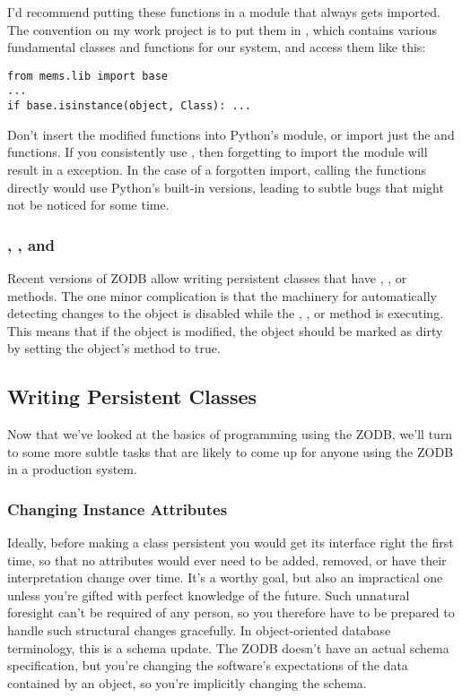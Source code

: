 I'd recommend putting these functions in a module that always gets
imported.  The convention on my work project is to put them in
, which contains various fundamental classes
and functions for our system, and access them like this:

\begin{verbatim}
from mems.lib import base
...
if base.isinstance(object, Class): ...
\end{verbatim}

Don't insert the modified functions into Python's
 module, or import just the
 and  functions.  
If you consistently use , then forgetting
to import the  module will result in a
 exception.  In the
case of a forgotten import, calling the functions directly would use
Python's built-in versions, leading to subtle bugs that might not be
noticed for some time.

\subsubsection{, , and }

Recent versions of ZODB allow writing persistent classes that have
, , or 
methods.  The one minor complication is that the machinery for
automatically detecting changes to the object is disabled while the
, , or 
method is executing.  This means that if the object is modified, the
object should be marked as dirty by setting the object's
 method to true.

\subsection{Writing Persistent Classes}

Now that we've looked at the basics of programming using the ZODB,
we'll turn to some more subtle tasks that are likely to come up for
anyone using the ZODB in a production system.

\subsubsection{Changing Instance Attributes}

Ideally, before making a class persistent you would get its interface
right the first time, so that no attributes would ever need to be
added, removed, or have their interpretation change over time.  It's a
worthy goal, but also an impractical one unless you're gifted with
perfect knowledge of the future.  Such unnatural foresight can't be
required of any person, so you therefore have to be prepared to handle
such structural changes gracefully.  In object-oriented database
terminology, this is a schema update.  The ZODB doesn't have an actual
schema specification, but you're changing the software's expectations
of the data contained by an object, so you're implicitly changing the
schema.

